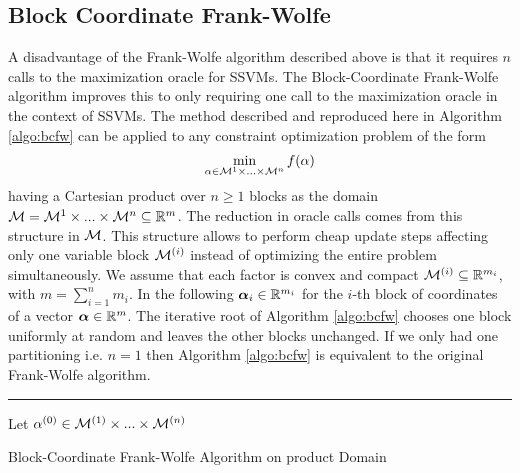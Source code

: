 \subsection{Block Coordinate Frank-Wolfe} \label{bcfw}

A disadvantage of the Frank-Wolfe algorithm described above is that it requires $n$ calls to the maximization oracle for SSVMs. The Block-Coordinate Frank-Wolfe algorithm \cite{lacoste2012block} improves this to only requiring one call to the maximization oracle in the context of SSVMs. The method described \cite{lacoste2012block} and reproduced here in Algorithm \ref{algo:bcfw} can be applied to any constraint optimization problem of the form 
\begin{align}
\min_{\alpha \in \mathcal{M}^1 \times ... \times \mathcal{M}^n} f(\alpha)
\end{align}
having a Cartesian product over $n \geq 1$ blocks as the domain $\mathcal{M} = \mathcal{M}^1 \times ... \times \mathcal{M}^n \subseteq \mathbb{R}^m $. The reduction in oracle calls comes from this structure in $\mathcal{M}$. This structure allows  to perform cheap update steps affecting only one variable block $\mathcal{M}^{(i)}$ instead of optimizing the entire problem simultaneously. We assume that each factor is convex and compact $\mathcal{M}^{(i)} \subseteq \mathbb{R}^{m_i} $, with $m = \sum^n_{i=1} m_i$. In the following $\bm{\alpha}_i \in \mathbb{R}^{m_i}$ for the $i$-th block of coordinates of a vector $\bm{\alpha} \in \mathbb{R}^m$. The iterative root of Algorithm \ref{algo:bcfw} chooses one block uniformly at random and leaves the other blocks unchanged. If we only had one partitioning i.e. $n=1$ then Algorithm \ref{algo:bcfw} is equivalent to the original Frank-Wolfe algorithm. 

\begin{samepage}
  \rule{\textwidth}{2pt}
  \begin{algorithm}[H]\label{algo:bcfw}
     Let $\alpha^{(0)} \in \mathcal{M}^{(1)} \times ... \times \mathcal{M}^{(n)}  $\;
     \caption{ Block-Coordinate Frank-Wolfe Algorithm on product Domain }
  \end{algorithm}
  \hrulefill
\end{samepage}

